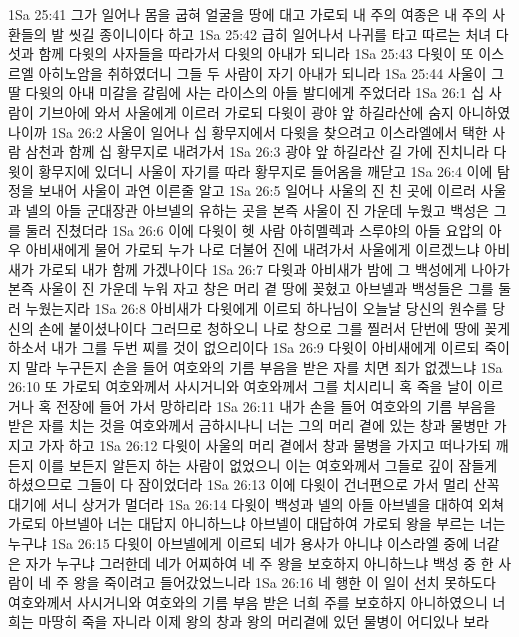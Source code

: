1Sa 25:41  그가 일어나 몸을 굽혀 얼굴을 땅에 대고 가로되 내 주의 여종은 내 주의 사환들의 발 씻길 종이니이다 하고
1Sa 25:42  급히 일어나서 나귀를 타고 따르는 처녀 다섯과 함께 다윗의 사자들을 따라가서 다윗의 아내가 되니라
1Sa 25:43  다윗이 또 이스르엘 아히노암을 취하였더니 그들 두 사람이 자기 아내가 되니라
1Sa 25:44  사울이 그 딸 다윗의 아내 미갈을 갈림에 사는 라이스의 아들 발디에게 주었더라
1Sa 26:1  십 사람이 기브아에 와서 사울에게 이르러 가로되 다윗이 광야 앞 하길라산에 숨지 아니하였나이까
1Sa 26:2  사울이 일어나 십 황무지에서 다윗을 찾으려고 이스라엘에서 택한 사람 삼천과 함께 십 황무지로 내려가서
1Sa 26:3  광야 앞 하길라산 길 가에 진치니라 다윗이 황무지에 있더니 사울이 자기를 따라 황무지로 들어옴을 깨닫고
1Sa 26:4  이에 탐정을 보내어 사울이 과연 이른줄 알고
1Sa 26:5  일어나 사울의 진 친 곳에 이르러 사울과 넬의 아들 군대장관 아브넬의 유하는 곳을 본즉 사울이 진 가운데 누웠고 백성은 그를 둘러 진쳤더라
1Sa 26:6  이에 다윗이 헷 사람 아히멜렉과 스루야의 아들 요압의 아우 아비새에게 물어 가로되 누가 나로 더불어 진에 내려가서 사울에게 이르겠느냐 아비새가 가로되 내가 함께 가겠나이다
1Sa 26:7  다윗과 아비새가 밤에 그 백성에게 나아가 본즉 사울이 진 가운데 누워 자고 창은 머리 곁 땅에 꽂혔고 아브넬과 백성들은 그를 둘러 누웠는지라
1Sa 26:8  아비새가 다윗에게 이르되 하나님이 오늘날 당신의 원수를 당신의 손에 붙이셨나이다 그러므로 청하오니 나로 창으로 그를 찔러서 단번에 땅에 꽂게 하소서 내가 그를 두번 찌를 것이 없으리이다
1Sa 26:9  다윗이 아비새에게 이르되 죽이지 말라 누구든지 손을 들어 여호와의 기름 부음을 받은 자를 치면 죄가 없겠느냐
1Sa 26:10  또 가로되 여호와께서 사시거니와 여호와께서 그를 치시리니 혹 죽을 날이 이르거나 혹 전장에 들어 가서 망하리라
1Sa 26:11  내가 손을 들어 여호와의 기름 부음을 받은 자를 치는 것을 여호와께서 금하시나니 너는 그의 머리 곁에 있는 창과 물병만 가지고 가자 하고
1Sa 26:12  다윗이 사울의 머리 곁에서 창과 물병을 가지고 떠나가되 깨든지 이를 보든지 알든지 하는 사람이 없었으니 이는 여호와께서 그들로 깊이 잠들게 하셨으므로 그들이 다 잠이었더라
1Sa 26:13  이에 다윗이 건너편으로 가서 멀리 산꼭대기에 서니 상거가 멀더라
1Sa 26:14  다윗이 백성과 넬의 아들 아브넬을 대하여 외쳐 가로되 아브넬아 너는 대답지 아니하느냐 아브넬이 대답하여 가로되 왕을 부르는 너는 누구냐
1Sa 26:15  다윗이 아브넬에게 이르되 네가 용사가 아니냐 이스라엘 중에 너같은 자가 누구냐 그러한데 네가 어찌하여 네 주 왕을 보호하지 아니하느냐 백성 중 한 사람이 네 주 왕을 죽이려고 들어갔었느니라
1Sa 26:16  네 행한 이 일이 선치 못하도다 여호와께서 사시거니와 여호와의 기름 부음 받은 너희 주를 보호하지 아니하였으니 너희는 마땅히 죽을 자니라 이제 왕의 창과 왕의 머리곁에 있던 물병이 어디있나 보라
